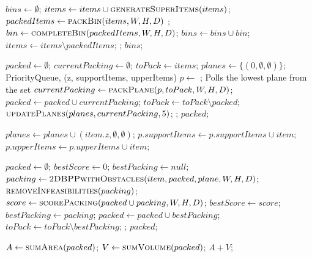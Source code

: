 \documentclass{article}
\begin{document}
\begin{algorithmic}[1]
        \State $bins \gets \emptyset$;
        \State $items \gets items \cup \Call{generateSuperItems}{items}$;
        \Repeat
            \State $packedItems \gets \Call{packBin}{items, W, H, D}$ ;
            \State $bin \gets \Call{completeBin}{packedItems, W, H, D}$;
            \State $bins \gets bins \cup bin$; 
            \State $items \gets items \setminus packedItems$;
        ;
        \State \Return $bins$;
    \EndFunction
    \vspace{1cm}

        \State $packed \gets \emptyset$;
        \State $currentPacking \gets \emptyset$;
        \State $toPack \gets items$;
        \State $planes \gets \{ (0, \emptyset, \emptyset) \}$; \Comment PriorityQueue, (z, supportItems, upperItems)
        \Repeat
            \State $p \gets $ ; \Comment Polls the lowest plane from the set
            \State $currentPacking \gets \Call{packPlane}{p, toPack, W, H, D}$;
            \State $packed \gets packed \cup currentPacking$;
            \State $toPack \gets toPack \setminus packed$;
            \State $\Call{updatePlanes}{planes, currentPacking, 5}$;
        ;
        \State \Return $packed$;
    \EndFunction
    \vspace{1cm}

                \State $planes \gets planes \cup (item.z, \emptyset, \emptyset)$;
            \EndIf
                \State $p.supportItems \gets p.supportItems \cup item$;
            \EndFor
                \State $p.upperItems \gets p.upperItems \cup item$;
            \EndFor
        \EndFor
    \EndProcedure
    \newpage

        \State $packed \gets \emptyset$;
        \Repeat
            \State $bestScore \gets 0$;
            \State $bestPacking \gets null$;
                \State $packing \gets \Call{2DBPPwithObstacles}{item, packed, plane, W, H, D}$;
                \State $\Call{removeInfeasibilities}{packing}$;
                \State $score \gets \Call{scorePacking}{packed \cup packing, W, H, D}$;
                    \State $bestScore \gets score$;
                    \State $bestPacking \gets packing$;
                \EndIf
            \EndFor
            \State $packed \gets packed \cup bestPacking$;
            \State $toPack \gets toPack \setminus bestPacking$;
        ;
        \State \Return $packed$;
    \EndFunction
    \vspace{1cm}

        \State $A \gets \Call{sumArea}{packed}$;
        \State $V \gets \Call{sumVolume}{packed}$;
        \State \Return $A + V$;
    \EndFunction
\end{algorithmic}
\end{document}
